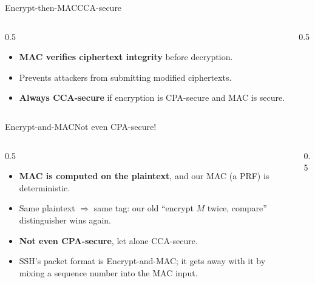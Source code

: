 \ifdefined\PRESENTATION\else\PassOptionsToClass{handout}{beamer}\fi\documentclass[aspectratio=169, lualatex]{beamer}
\begin{document}
\begin{frame}{Encrypt-then-MAC}{CCA-secure}
	\begin{columns}[c]
		\begin{column}{0.5\textwidth}
			\begin{itemize}
				\item \textbf{MAC verifies ciphertext integrity} before decryption.
				\item Prevents attackers from submitting modified ciphertexts.
				\item \textbf{Always CCA-secure} if encryption is CPA-secure and MAC is secure.
			\end{itemize}
		\end{column}
		\begin{column}{0.5\textwidth}
		\end{column}
	\end{columns}
\end{frame}

\begin{frame}{Encrypt-and-MAC}{Not even CPA-secure!}
	\begin{columns}[c]
		\begin{column}{0.5\textwidth}
			\begin{itemize}
				\item \textbf{MAC is computed on the plaintext}, and our MAC (a PRF) is deterministic.
				\item Same plaintext $\Rightarrow$ same tag: our old ``encrypt $M$ twice, compare'' distinguisher wins again.
				\item \textbf{Not even CPA-secure}, let alone CCA-secure.
				\item SSH's packet format is Encrypt-and-MAC; it gets away with it by mixing a sequence number into the MAC input.
			\end{itemize}
		\end{column}
		\begin{column}{0.5\textwidth}
		\end{column}
	\end{columns}
\end{frame}
\end{document}
